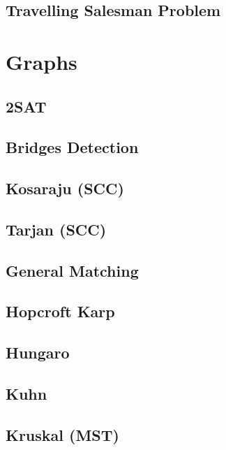 \subsection{Travelling Salesman Problem}
\raggedbottom
\hrulefill
\newpage

\section{Graphs}
\subsection{2SAT}
\raggedbottom
\hrulefill
\subsection{Bridges Detection}
\raggedbottom
\hrulefill
\subsection{Kosaraju (SCC)}
\raggedbottom
\hrulefill
\subsection{Tarjan (SCC)}
\raggedbottom
\hrulefill
\subsection{General Matching}
\raggedbottom
\hrulefill
\subsection{Hopcroft Karp}
\raggedbottom
\hrulefill
\subsection{Hungaro}
\raggedbottom
\hrulefill
\subsection{Kuhn}
\raggedbottom
\hrulefill
\subsection{Kruskal (MST)}
\raggedbottom
\hrulefill

